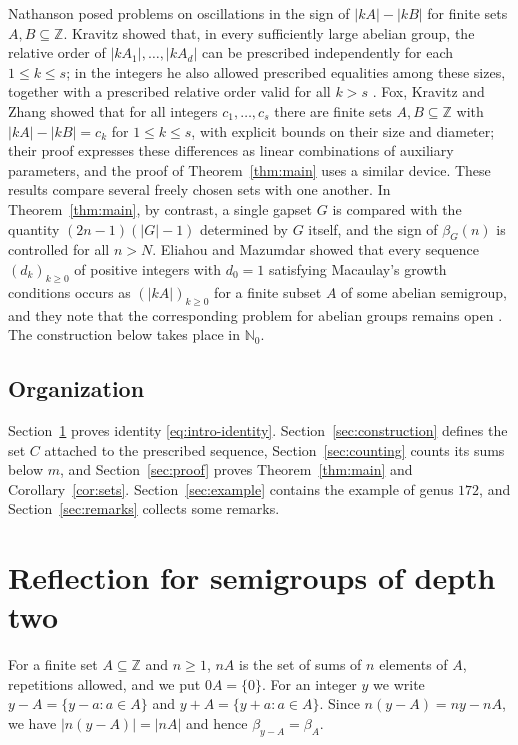 \documentclass[11pt]{amsart}
\theoremstyle{definition}
\theoremstyle{remark}
\numberwithin{equation}{section}
\newcommand{\NN}{\mathbb{N}_0}
\begin{document}
Nathanson \cite{Nat26} posed problems on oscillations in the sign of $|kA|-|kB|$ for finite sets $A,B\subseteq\mathbb{Z}$. Kravitz \cite[Theorem~1.1]{Kra25} showed that, in every sufficiently large abelian group, the relative order of $|kA_1|,\dots,|kA_d|$ can be prescribed independently for each $1\le k\le s$; in the integers he also allowed prescribed equalities among these sizes, together with a prescribed relative order valid for all $k>s$ \cite[Theorem~1.2]{Kra25}. Fox, Kravitz and Zhang \cite[Theorem~2]{FKZ26} showed that for all integers $c_1,\dots,c_s$ there are finite sets $A,B\subseteq\mathbb{Z}$ with $|kA|-|kB|=c_k$ for $1\le k\le s$, with explicit bounds on their size and diameter; their proof expresses these differences as linear combinations of auxiliary parameters, and the proof of Theorem~\ref{thm:main} uses a similar device. These results compare several freely chosen sets with one another. In Theorem~\ref{thm:main}, by contrast, a single gapset $G$ is compared with the quantity $(2n-1)(|G|-1)$ determined by $G$ itself, and the sign of $\beta_G(n)$ is controlled for all $n>N$. Eliahou and Mazumdar \cite[Theorem~4.12]{EM25} showed that every sequence $(d_k)_{k\ge 0}$ of positive integers with $d_0=1$ satisfying Macaulay's growth conditions occurs as $(|kA|)_{k\ge 0}$ for a finite subset $A$ of some abelian semigroup, and they note that the corresponding problem for abelian groups remains open \cite[Section~5]{EM25}. The construction below takes place in $\NN$.

\subsection*{Organization}
Section~\ref{sec:reflection} proves identity \eqref{eq:intro-identity}. Section~\ref{sec:construction} defines the set $C$ attached to the prescribed sequence, Section~\ref{sec:counting} counts its sums below $m$, and Section~\ref{sec:proof} proves Theorem~\ref{thm:main} and Corollary~\ref{cor:sets}. Section~\ref{sec:example} contains the example of genus $172$, and Section~\ref{sec:remarks} collects some remarks.

\section{Reflection for semigroups of depth two}\label{sec:reflection}

For a finite set $A\subseteq\mathbb{Z}$ and $n\ge1$, $nA$ is the set of sums of $n$ elements of $A$, repetitions allowed, and we put $0A=\{0\}$. For an integer $y$ we write $y-A=\{y-a:a\in A\}$ and $y+A=\{y+a:a\in A\}$. Since $n(y-A)=ny-nA$, we have $|n(y-A)|=|nA|$ and hence $\beta_{y-A}=\beta_A$.
\end{document}
